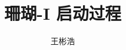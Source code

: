 \documentclass{thesis-uestc}
\title{珊瑚-I 启动过程}{aCoral-I Boot Process}
\author{王彬浩}{Wang BinHao}
\begin{document}
\makecover





\thesistableofcontents




\end{document}
